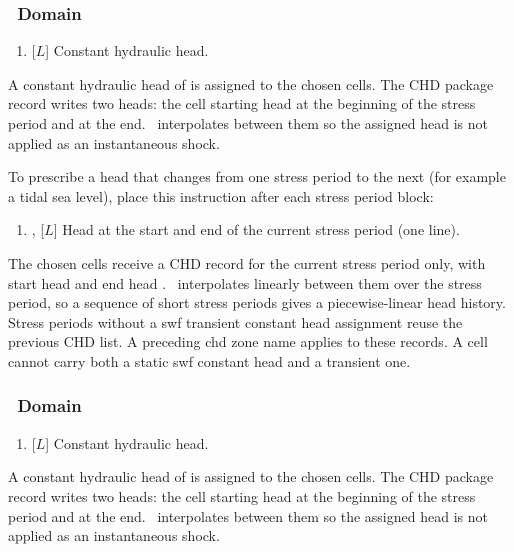 \subsubsection{\swf\ Domain}
    {
        \squish
        \begin{enumerate}
        \item {} [$L$]  Constant hydraulic head.
        \end{enumerate}
          A constant hydraulic head of  is assigned to the chosen cells.
          The CHD package record writes two heads: the cell starting head at the beginning of the stress period and  at the end. \mfus\ interpolates between them so the assigned head is not applied as an instantaneous shock.
    }

To prescribe a head that changes from one stress period to the next (for example a tidal sea level), place this instruction after each {\sf stress period} block:

    {
        \squish
        \begin{enumerate}
        \item {},  [$L$]  Head at the start and end of the current stress period (one line).
        \end{enumerate}
          The chosen cells receive a CHD record for the current stress period only, with start head  and end head . \mfus\ interpolates linearly between them over the stress period, so a sequence of short stress periods gives a piecewise-linear head history.
          Stress periods without a {\sf swf transient constant head} assignment reuse the previous CHD list. A preceding {\sf chd zone name} applies to these records. A cell cannot carry both a static {\sf swf constant head} and a transient one.
    }

\subsubsection{\cln\ Domain}
    {
        \squish
        \begin{enumerate}
        \item {} [$L$]  Constant hydraulic head.
        \end{enumerate}
          A constant hydraulic head of  is assigned to the chosen cells.
          The CHD package record writes two heads: the cell starting head at the beginning of the stress period and  at the end. \mfus\ interpolates between them so the assigned head is not applied as an instantaneous shock.
    }

